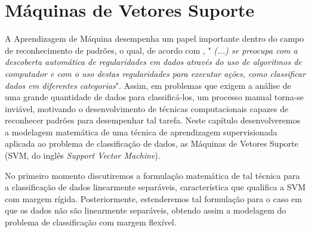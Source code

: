 \documentclass[12pt,a4paper]{scrartcl}
\def\RR{\mathds{R}}
\newtheorem{prop}{Proposição}
\theoremstyle{definition}%
\begin{document}


\newpage
\section{Máquinas de Vetores Suporte} \label{chap:maquinas_vetores_suporte}

A Aprendizagem de Máquina desempenha um papel importante dentro do campo de reconhecimento de padrões, o qual, de acordo com \textcite{bishop2016pattern}, "\textit{ (...) se preocupa com a descoberta automática de regularidades em dados através do uso de algoritmos de computador e com o uso destas regularidades para executar ações, como classificar dados em diferentes categorias}". Assim, em problemas que exigem a análise de uma grande quantidade de dados para classificá-los, um processo manual torna-se inviável, motivando o desenvolvimento de técnicas computacionais capazes de reconhecer padrões para desempenhar tal tarefa. Neste capítulo desenvolveremos a modelagem matemática de uma técnica de aprendizagem supervisionada aplicada ao problema de classificação de dados, as Máquinas de Vetores Suporte (SVM, do inglês \textit{Support Vector Machine}). 

No primeiro momento discutiremos a formulação matemática de tal técnica para a classificação de dados linearmente separáveis, característica que qualifica a SVM com margem rígida. Posteriormente, estenderemos tal formulação para o caso em que os dados não são linearmente separáveis, obtendo assim a modelagem do problema de classificação com margem flexível.
\end{document}
